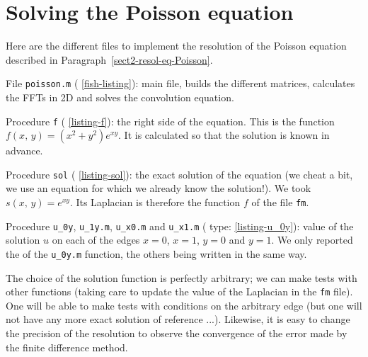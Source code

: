 \section{Solving the Poisson equation}
\label{sect1-listing-fish}
 
Here are the different files to implement the resolution of the Poisson equation described in Paragraph~\ref{sect2-resol-eq-Poisson}. \begin{rs}
\item File \texttt{poisson.m} (\listingterme{} \ref{fish-listing}): main file, builds the different matrices, calculates the FFTs in 2D and solves the convolution equation.
\item Procedure \texttt{f} (\listingterme{} \ref{listing-f}): the right side of the equation. This is the function $ f(x, \, y) = (x^2 + y^2) e^{xy} $. It is calculated so that the solution is known in advance.
\item Procedure \texttt{sol} (\listingterme{} \ref{listing-sol}): the exact solution of the equation (we cheat a bit, we use an equation for which we already know the solution!). We took $ s (x, \, y) = e^{xy} $. Its Laplacian is therefore the function $ f $ of the file \texttt{fm}.
\item Procedure \texttt{u\_0y}, \texttt{u\_1y.m}, \texttt{u\_x0.m} and \texttt{u\_x1.m} (\listingterme{} type: \ref{listing-u_0y}): value of the solution $ u $ on each of the edges $ x = 0 $, $ x = 1 $, $ y = 0 $ and $ y = 1 $. We only reported the \listingterme{} of the \texttt{u\_0y.m} function, the others being written in the same way.
\end{rs} The choice of the solution function is perfectly arbitrary; we can make tests with other functions (taking care to update the value of the Laplacian in the \texttt{fm} file). One will be able to make tests with conditions on the arbitrary edge (but one will not have any more exact solution of reference ...). Likewise, it is easy to change the precision of the resolution to observe the convergence of the error made by the finite difference method.

